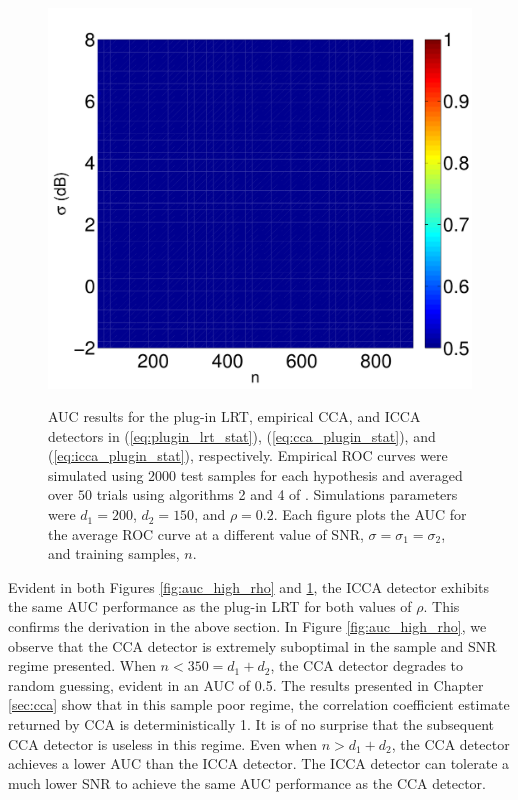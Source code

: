 \begin{figure}
{    \centering\includegraphics[width=\figwidth]{figures/auc_cca_low_rho.pdf}
    \label{fig:auc_cca_low_rho}
  }
  \caption{AUC results for the plug-in LRT, empirical CCA, and ICCA detectors in
    (\ref{eq:plugin_lrt_stat}), (\ref{eq:cca_plugin_stat}), and
    (\ref{eq:icca_plugin_stat}), respectively. Empirical ROC curves were simulated using
    $2000$ test samples for each hypothesis and averaged over $50$ trials using
    algorithms 2 and 4 of \cite{fawcett2006introduction}. Simulations parameters were
    $d_1=200$, $d_2=150$, and $\rho=0.2$. Each figure plots the AUC for the average ROC curve
    at a different value of SNR, $\sigma=\sigma_1=\sigma_2$, and training samples, $n$.}
  \label{fig:auc_low_rho}
\end{figure}

Evident in both Figures \ref{fig:auc_high_rho} and \ref{fig:auc_low_rho}, the ICCA
detector exhibits the same AUC performance as the plug-in LRT for both values of
$\rho$. This confirms the derivation in the above section. In Figure
\ref{fig:auc_high_rho}, we observe that the CCA detector is extremely suboptimal in the
sample and SNR regime presented. When $n<350=d_1+d_2$, the CCA detector degrades to random
guessing, evident in an AUC of 0.5. The results presented in Chapter
\ref{sec:cca} show that in this sample poor regime, the correlation coefficient
estimate returned by CCA is deterministically 1. It is of no surprise that the subsequent
CCA detector is useless in this regime. Even when $n>d_1+d_2$, the CCA detector achieves a
lower AUC than the ICCA detector. The ICCA detector can tolerate a much lower SNR to achieve
the same AUC performance as the CCA detector.

